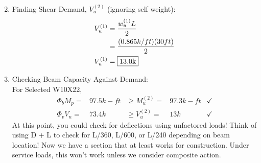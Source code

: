 \documentclass{report} %
\begin{document}
\begin{enumerate}
\begin{equation*}
        \end{equation*}
    \item Finding Shear Demand, $V^{(2)}_u$ (ignoring self weight):
        \begin{equation*}
            \begin{aligned}
                V^{(1)}_u   &= \frac{{w^{(1)}_u}L}{2} \\
                            &= \frac{(0.865k/ft)(30ft)}{2} \\
                V^{(1)}_u   &= \framebox{13.0k}
            \end{aligned}
        \end{equation*}
    \item Checking Beam Capacity Against Demand: \\
    For Selected W10X22,
        \begin{equation*}
            \begin{aligned}
                \Phi _b M_p = &97.5k-ft &\geq M^{(2)}_u = &97.3k-ft &\checkmark\\
                \Phi _v V_n = &73.4k &\geq V^{(2)}_u = &13k &\checkmark
            \end{aligned}
        \end{equation*}
    At this point, you could check for deflections using unfactored loads! Think of using D + L to check for L/360, L/600, or L/240 depending on beam location! 
    \newline
    Now we have a section that at least works for construction. Under service loads, this won't work unless we consider composite action.
\end{enumerate}
\end{document}
